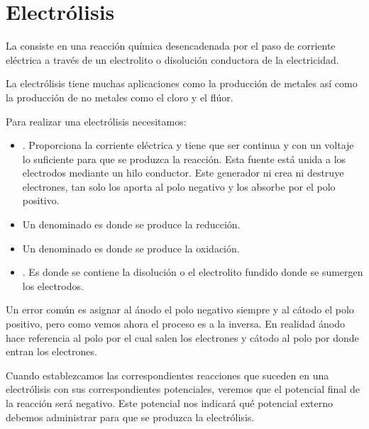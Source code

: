 \section{Electrólisis}\label{sec:electrolisis}

\begin{center}
    \begin{definition}[Electrólisis]
        La  consiste en una reacción química desencadenada por el paso de corriente eléctrica a través de un electrolito o disolución conductora de la electricidad.
    \end{definition}
\end{center}


La electrólisis tiene muchas aplicaciones como la producción de metales así como la producción de no metales como el cloro y el flúor.

Para realizar una electrólisis necesitamos:

\begin{itemize}
    [label={\color{myOrange3} \(\blacksquare\)}]
    \item {}.
    Proporciona la corriente eléctrica y tiene que ser continua y con un voltaje lo suficiente para que se produzca la reacción.
    Esta fuente está unida a los electrodos mediante un hilo conductor.
    Este generador ni crea ni destruye electrones, tan solo los aporta al polo negativo y los absorbe por el polo positivo.
    \item Un  denominado  es donde se produce la reducción.
    \item Un  denominado  es donde se produce la oxidación.
    \item {}.
    Es donde se contiene la disolución o el electrolito fundido donde se sumergen los electrodos.
\end{itemize}

Un error común es asignar al ánodo el polo negativo siempre y al cátodo el polo positivo, pero como vemos ahora el proceso es a la inversa.
En realidad ánodo hace referencia al polo por el cual salen los electrones y cátodo al polo por donde entran los electrones.

Cuando establezcamos las correspondientes reacciones que suceden en una electrólisis con sus correspondientes potenciales, veremos que el potencial final de la reacción será negativo.
Este potencial nos indicará qué potencial externo debemos administrar para que se produzca la electrólisis.

